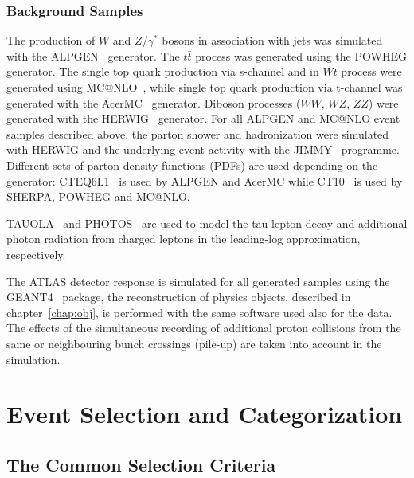 \subsubsection{Background Samples}
The production of $W$ and $Z/\gamma^*$ bosons in association with jets
was simulated with the ALPGEN~\cite{Alpgen} generator. 
The $t\bar{t}$ process was generated using the POWHEG generator. The single top quark 
production via s-channel and in  $Wt$
process were generated using MC@NLO~\cite{MCatNLO}, while single top quark production via 
t-channel  was generated with the AcerMC~\cite{AcerMC} generator.  Diboson processes ($WW$, $WZ$, $ZZ$) were generated with
the HERWIG~\cite{Herwig} generator.  For all ALPGEN and MC@NLO event samples described
above, the parton shower and hadronization were simulated with HERWIG
and the underlying event activity with the JIMMY~\cite{JIMMY} programme.
Different sets of parton density functions (PDFs)  are used depending on
the generator: CTEQ6L1~\cite{CTEQ6} is used by ALPGEN and AcerMC while
CT10~\cite{CT10} is used by SHERPA, POWHEG and MC@NLO. 

TAUOLA~\cite{TAUOLA} and PHOTOS~\cite{PHOTOS} are used to model the
tau lepton decay and additional photon radiation from charged leptons
in the leading-log approximation, respectively.

The ATLAS detector response is simulated for all generated samples using the GEANT4~\cite{Geant4,ATLASSIM} package,
the reconstruction of physics objects, described in chapter~\ref{chap:obj}, is performed with the same software used also for 
the data.
The effects of the simultaneous recording of additional proton collisions from the
same or neighbouring bunch crossings (pile-up) are taken into account in the
simulation. 



\section{Event Selection and Categorization}\label{sec:selection}


\subsection{The Common Selection Criteria}\label{sec:presel}

